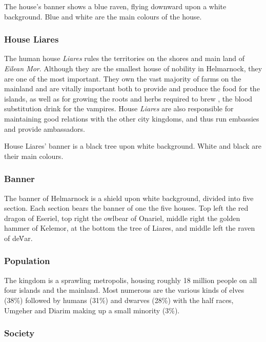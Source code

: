 The house's banner shows a blue raven, flying downward upon a white
background.  Blue and white are the main colours of the house.

\subsubsection*{House Liares}
\label{sec:House Liares}

The human house \emph{Liares} rules the territories on the shores and main
land of \emph{Eilean Mor}. Although they are the smallest house of nobility in
Helmarnock, they are one of the most important. They own the vast majority of
farms on the mainland and are vitally important both to provide and produce
the food for the islands, as well as for growing the roots and herbs required
to brew , the blood substitution drink for the
vampires. House \emph{Liares} are also responsible for maintaining good
relations with the other city kingdoms, and thus run embassies and provide
ambassadors.

House Liares' banner is a black tree upon white background. White and black
are their main colours.

\subsubsection*{Banner}

The banner of Helmarnock is a shield upon white background, divided into five
section. Each section bears the banner of one the five houses. Top left the
red dragon of Eseriel, top right the owlbear of Onariel, middle right the
golden hammer of Kelemor, at the bottom the tree of Liares, and middle left
the raven of de\'Var.

\subsubsection*{Population}

The kingdom is a sprawling metropolis, housing roughly 18 million people on
all four islands and the mainland. Most numerous are the various kinds of
elves (38\%) followed by humans (31\%) and dwarves (28\%) with the half
races, Umgeher and Diarim making up a small minority (3\%).

\subsubsection*{Society}

